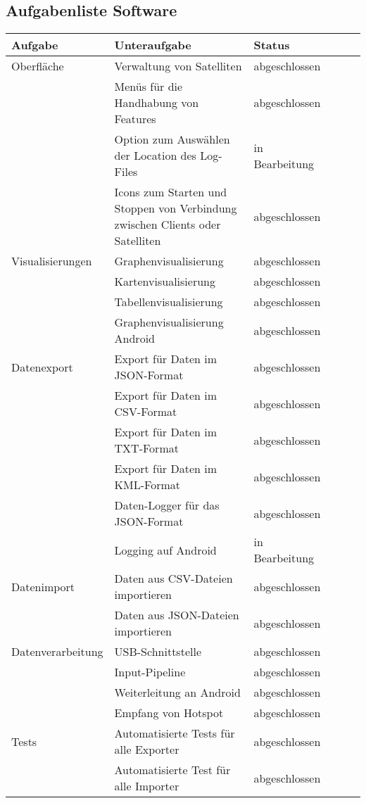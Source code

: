 \subsection{Aufgabenliste Software}
\begin{table}[H]
  \centering
    \begin{tabular}{p{3cm}p{7cm}p{3cm}rrr}
    \toprule
    \textbf{Aufgabe} & \textbf{Unteraufgabe} & \textbf{Status} \\
	\midrule
	Oberfläche & Verwaltung von Satelliten & abgeschlossen \\
	& Menüs für die Handhabung von Features & abgeschlossen\\
	& Option zum Auswählen der Location des Log-Files & in Bearbeitung\\
	& Icons zum Starten und Stoppen von Verbindung zwischen Clients oder Satelliten & abgeschlossen \\	
	\midrule
	Visualisierungen & Graphenvisualisierung & abgeschlossen \\
	& Kartenvisualisierung & abgeschlossen \\
	& Tabellenvisualisierung & abgeschlossen \\
  & Graphenvisualisierung Android & abgeschlossen \\
	\midrule
	Datenexport & Export für Daten im JSON-Format & abgeschlossen \\
	& Export für Daten im CSV-Format & abgeschlossen \\
	& Export für Daten im TXT-Format & abgeschlossen \\
	& Export für Daten im KML-Format & abgeschlossen \\
	& Daten-Logger für das JSON-Format & abgeschlossen \\
  & Logging auf Android & in Bearbeitung \\
	\midrule
	Datenimport & Daten aus CSV-Dateien importieren & abgeschlossen \\
	& Daten aus JSON-Dateien importieren & abgeschlossen \\
	\midrule
	Datenverarbeitung & USB-Schnittstelle & abgeschlossen \\
	& Input-Pipeline & abgeschlossen \\
  & Weiterleitung an Android & abgeschlossen \\
  & Empfang von Hotspot & abgeschlossen \\
	\midrule
	Tests & Automatisierte Tests für alle Exporter & abgeschlossen \\
	& Automatisierte Test für alle Importer & abgeschlossen \\

\end{tabular}
\end{table}
